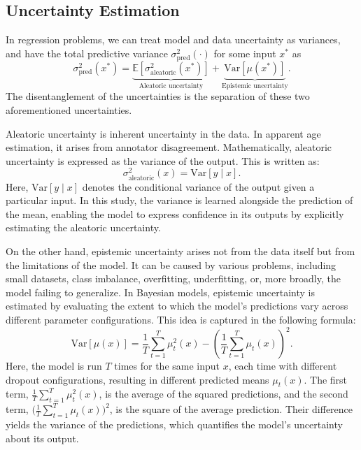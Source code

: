 \documentclass[runningheads]{llncs}
\begin{document}
\subsection{Uncertainty Estimation}

In regression problems, we can treat model and data uncertainty as variances, and have the total predictive variance $\sigma^2_{\mathrm{pred}}(\cdot)$ for some input $x^*$ as
\begin{equation}
\sigma^2_{\mathrm{pred}}(x^*) = \underbrace{\mathbb{E}\!\left[\sigma^2_{\mathrm{aleatoric}}(x^*)\right]}_{\text{Aleatoric uncertainty}} + \underbrace{\mathrm{Var}\!\left[\mu(x^*)\right]}_{\text{Epistemic uncertainty}}.
\label{eq:total}
\end{equation}
The disentanglement of the uncertainties is the separation of these two aforementioned uncertainties.

Aleatoric uncertainty is inherent uncertainty in the data. In apparent age estimation, it arises from annotator disagreement. Mathematically, aleatoric uncertainty is expressed as the variance of the output. This is written as:
\begin{equation}
\sigma^2_{\mathrm{aleatoric}}(x) = \mathrm{Var}[y\mid x].
\label{eq:aleatoric}
\end{equation}
Here, $\mathrm{Var}[y\mid x]$ denotes the conditional variance of the output given a particular input. In this study, the variance is learned alongside the prediction of the mean, enabling the model to express confidence in its outputs by explicitly estimating the aleatoric uncertainty.

On the other hand, epistemic uncertainty arises not from the data itself but from the limitations of the model. It can be caused by various problems, including small datasets, class imbalance, overfitting, underfitting, or, more broadly, the model failing to generalize. In Bayesian models, epistemic uncertainty is estimated by evaluating the extent to which the model's predictions vary across different parameter configurations. This idea is captured in the following formula:
\begin{equation}
\mathrm{Var}[\mu(x)] = \frac{1}{T}\sum_{t=1}^{T}\mu_t^2(x) - \left(\frac{1}{T}\sum_{t=1}^{T}\mu_t(x)\right)^2.
\label{eq:epistemic}
\end{equation}
Here, the model is run $T$ times for the same input $x$, each time with different dropout configurations, resulting in different predicted means $\mu_t(x)$. The first term, $\tfrac{1}{T}\sum_{t=1}^{T}\mu_t^2(x)$, is the average of the squared predictions, and the second term, $\bigl(\tfrac{1}{T}\sum_{t=1}^{T}\mu_t(x)\bigr)^2$, is the square of the average prediction. Their difference yields the variance of the predictions, which quantifies the model's uncertainty about its output.
\end{document}
